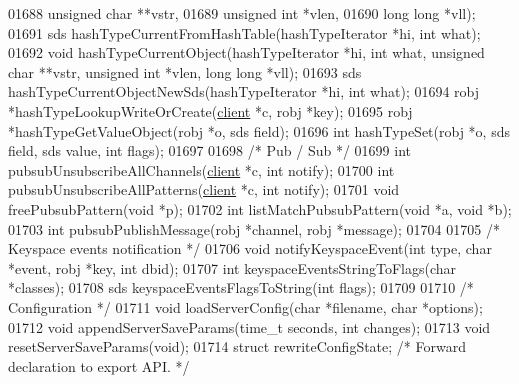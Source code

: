 \begin{DoxyCode}
{{{{{{{01688                                 \textcolor{keywordtype}{unsigned} \textcolor{keywordtype}{char} **vstr,
01689                                 \textcolor{keywordtype}{unsigned} \textcolor{keywordtype}{int} *vlen,
01690                                 \textcolor{keywordtype}{long} \textcolor{keywordtype}{long} *vll);
01691 sds hashTypeCurrentFromHashTable(hashTypeIterator *hi, \textcolor{keywordtype}{int} what);
01692 \textcolor{keywordtype}{void} hashTypeCurrentObject(hashTypeIterator *hi, \textcolor{keywordtype}{int} what, \textcolor{keywordtype}{unsigned} \textcolor{keywordtype}{char} **vstr, \textcolor{keywordtype}{unsigned} \textcolor{keywordtype}{int} *vlen, \textcolor{keywordtype}{
      long} \textcolor{keywordtype}{long} *vll);
01693 sds hashTypeCurrentObjectNewSds(hashTypeIterator *hi, \textcolor{keywordtype}{int} what);
01694 robj *hashTypeLookupWriteOrCreate(\hyperlink{structclient}{client} *c, robj *key);
01695 robj *hashTypeGetValueObject(robj *o, sds field);
01696 \textcolor{keywordtype}{int} hashTypeSet(robj *o, sds field, sds value, \textcolor{keywordtype}{int} flags);
01697 
01698 \textcolor{comment}{/* Pub / Sub */}
01699 \textcolor{keywordtype}{int} pubsubUnsubscribeAllChannels(\hyperlink{structclient}{client} *c, \textcolor{keywordtype}{int} notify);
01700 \textcolor{keywordtype}{int} pubsubUnsubscribeAllPatterns(\hyperlink{structclient}{client} *c, \textcolor{keywordtype}{int} notify);
01701 \textcolor{keywordtype}{void} freePubsubPattern(\textcolor{keywordtype}{void} *p);
01702 \textcolor{keywordtype}{int} listMatchPubsubPattern(\textcolor{keywordtype}{void} *a, \textcolor{keywordtype}{void} *b);
01703 \textcolor{keywordtype}{int} pubsubPublishMessage(robj *channel, robj *message);
01704 
01705 \textcolor{comment}{/* Keyspace events notification */}
01706 \textcolor{keywordtype}{void} notifyKeyspaceEvent(\textcolor{keywordtype}{int} type, \textcolor{keywordtype}{char} *event, robj *key, \textcolor{keywordtype}{int} dbid);
01707 \textcolor{keywordtype}{int} keyspaceEventsStringToFlags(\textcolor{keywordtype}{char} *classes);
01708 sds keyspaceEventsFlagsToString(\textcolor{keywordtype}{int} flags);
01709 
01710 \textcolor{comment}{/* Configuration */}
01711 \textcolor{keywordtype}{void} loadServerConfig(\textcolor{keywordtype}{char} *filename, \textcolor{keywordtype}{char} *options);
01712 \textcolor{keywordtype}{void} appendServerSaveParams(time\_t seconds, \textcolor{keywordtype}{int} changes);
01713 \textcolor{keywordtype}{void} resetServerSaveParams(\textcolor{keywordtype}{void});
01714 \textcolor{keyword}{struct} rewriteConfigState; \textcolor{comment}{/* Forward declaration to export API. */}
}}}}}}}
\end{DoxyCode}
